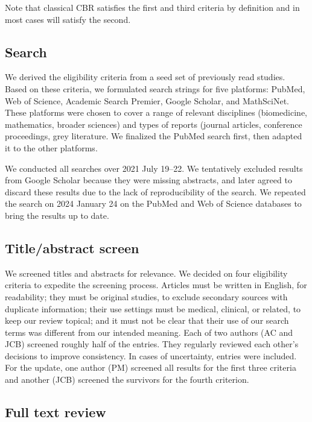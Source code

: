\documentclass[sn-mathphys,Numbered,pdflatex]{sn-jnl}
\theoremstyle{remark}
\theoremstyle{definition}
\newcommand{\hl}[1]{#1}
\begin{document}
\hl{Note that classical CBR satisfies the first and third criteria by definition and in most cases will satisfy the second.}

\subsection{Search}\label{search}

We derived the eligibility \hl{criteria }from a seed set of previously
read studies. Based on these criteria, we formulated search strings for
five platforms: PubMed, Web of Science, Academic Search Premier, Google
Scholar, and MathSciNet.
\hl{These platforms were chosen to cover a range of relevant disciplines (biomedicine, mathematics, broader sciences) and types of reports (journal articles, conference proceedings, grey literature.}
We finalized the PubMed search first, then adapted it to the other
platforms\hl{.}

We conducted all searches over 2021 July 19--22. We tentatively excluded
results from Google Scholar because they were missing abstracts, and
later agreed to discard these results due to the lack of reproducibility
of the search.
We repeated the search on 2024 January 24 on the PubMed and Web of
Science databases to bring the results up to date.

\subsection{Title/abstract screen}\label{titleabstract-screen}

\hl{We} screened titles and abstracts for relevance. We decided on four
eligibility criteria to expedite the screening process. Articles must be
written in English, for readability; they must be original studies, to
exclude secondary sources with duplicate information; their use settings
must be medical, clinical, or related, to keep our review topical; and
it must not be clear that their use of our search terms was different
from our intended meaning. Each of two authors (AC and JCB) screened
roughly half of the entries. They regularly reviewed each other's
decisions to improve consistency. In cases of uncertainty, entries were
included. For the update, one author (PM) screened all results for
\hl{the first }three criteria and another (JCB) screened the survivors
for the fourth criterion.

\subsection{Full text review}\label{full-text-review}
\end{document}
